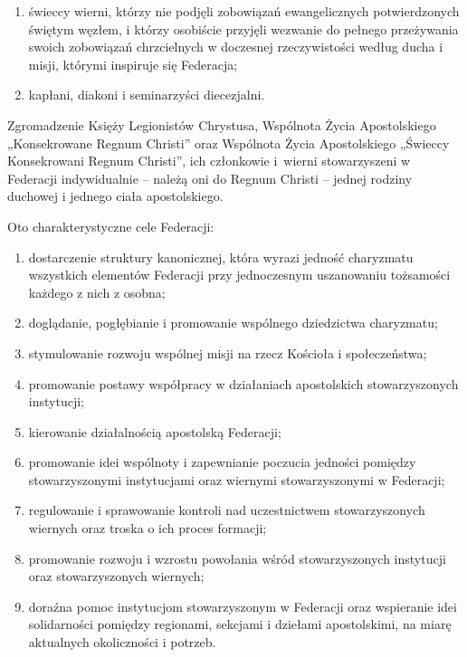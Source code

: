\begin{enumerate}


\item świeccy wierni, którzy nie podjęli zobowiązań ewangelicznych potwierdzonych świętym węzłem, i którzy osobiście przyjęli wezwanie do pełnego przeżywania swoich zobowiązań chrzcielnych w doczesnej rzeczywistości według ducha i misji, którymi inspiruje się Federacja;


\item kapłani, diakoni i seminarzyści diecezjalni.


\end{enumerate}
 


 Zgromadzenie Księży Legionistów Chrystusa, Wspólnota Życia Apostolskiego „Konsekrowane Regnum Christi” oraz Wspólnota Życia Apostolskiego „Świeccy Konsekrowani Regnum Christi”, ich członkowie \mbox{i wierni} stowarzyszeni w Federacji indywidualnie – należą oni do Regnum Christi – jednej rodziny duchowej i jednego ciała apostolskiego.




 Oto charakterystyczne  cele Federacji:


\begin{enumerate}


\item dostarczenie struktury kanonicznej, która wyrazi jedność charyzmatu wszystkich elementów Federacji przy jednoczesnym uszanowaniu tożsamości każdego z nich z osobna;


\item doglądanie, pogłębianie i promowanie wspólnego dziedzictwa charyzmatu;


\item stymulowanie rozwoju wspólnej misji na rzecz Kościoła i społeczeństwa;


\item promowanie postawy współpracy w działaniach apostolskich stowarzyszonych instytucji;


\item kierowanie działalnością apostolską Federacji;


\item promowanie idei wspólnoty i zapewnianie poczucia jedności pomiędzy stowarzyszonymi instytucjami oraz wiernymi stowarzyszonymi w Federacji;


\item regulowanie i sprawowanie kontroli nad uczestnictwem stowarzyszonych wiernych oraz troska o ich proces formacji;


\item promowanie rozwoju i wzrostu powołania wśród stowarzyszonych instytucji oraz stowarzyszonych wiernych;


\item doraźna pomoc instytucjom stowarzyszonym w Federacji oraz wspieranie idei solidarności pomiędzy regionami, sekcjami i dziełami apostolskimi, na miarę aktualnych okoliczności i potrzeb.


\end{enumerate}
 
